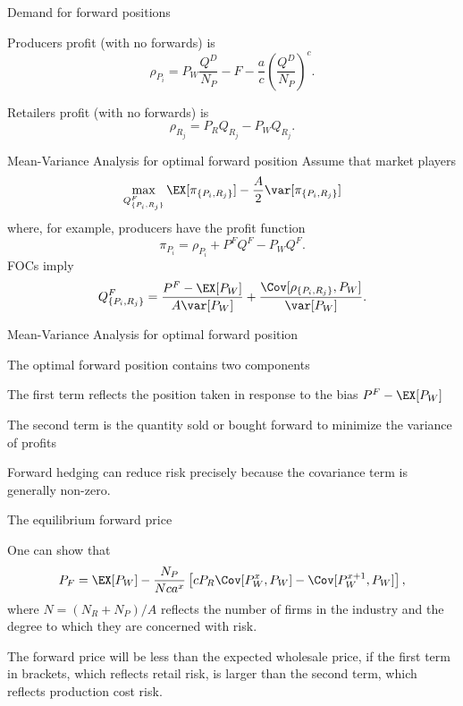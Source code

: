 {Demand for forward positions}
\item<1-> Producers profit (with no forwards) is
$$
\rho_{P_i}=P_W\frac{Q^D}{N_P}-F-\frac{a}{c}\left(\frac{Q^D}{N_P}\right)^{c}.$$
\item<2-> Retailers profit (with no forwards) is
$$
\rho_{R_j}=P_RQ_{R_j}-P_WQ_{R_j}.
$$

{Mean-Variance Analysis for optimal forward position}
Assume that market players
$$
\max_{Q^F_{\{P_i,R_j\}}}\EX[\pi_{\{P_i,R_j\}}]-\frac{A}{2}\var[\pi_{\{P_i,R_j\}}]
$$
where, for example, producers have the profit function
$$
\pi_{P_i}=\rho_{P_i}+ P^FQ^F-P_WQ^F.
$$
FOCs imply
$$
Q^F_{\{P_i,R_j\}}= \frac{P^F-\EX[P_W]}{A\var[P_W]}+\frac{\Cov[\rho_{\{P_i,R_j\}},P_W]}{\var[P_W]}.
$$

{Mean-Variance Analysis for optimal forward position}
\item<1-> The optimal forward position contains two components
\item The first term reflects the position taken in response to the bias $P^F-\EX[P_W]$
\item The second term is the quantity sold or bought forward to minimize the variance of profits
\item<2-> Forward hedging can reduce risk precisely because the covariance term is generally non-zero.

{The equilibrium forward price}
\item<1-> One can show that
$$
P_F=\EX[P_W]-\frac{N_P}{Nca^x}\left[cP_R\Cov[P_W^{x}, P_W]-\Cov[P_W^{x+1}, P_W]\right],
$$
where $N=(N_R+N_P)/A$ reflects the number of firms in the industry and the degree to which they are concerned with risk.
\item<2-> The forward price will be less than the expected wholesale price, if the first term in brackets, which reflects retail risk, is
larger than the second term, which reflects production cost risk.



